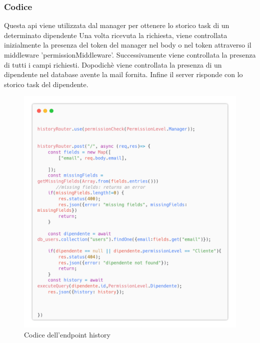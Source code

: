\documentclass{report}
\begin{document}
\subsubsection*{Codice}
Questa api viene utilizzata dal manager per ottenere lo storico task di un determinato dipendente
Una volta ricevuta la richiesta, viene controllata inizialmente la presenza del token del manager nel body o nel token attraverso il middleware 'permissionMiddleware'.
Successivamente viene controllata la presenza di tutti i campi richiesti.
Dopodichè viene controllata la presenza di un dipendente nel database avente la mail fornita.
Infine il server risponde con lo storico task del dipendente.
\begin{figure}[H]
	\centering\includegraphics[width=1\textwidth]{images/microservizio-dipendenti/history-carbon.png}
	\caption{Codice dell'endpoint history}
\end{figure}
\end{document}
